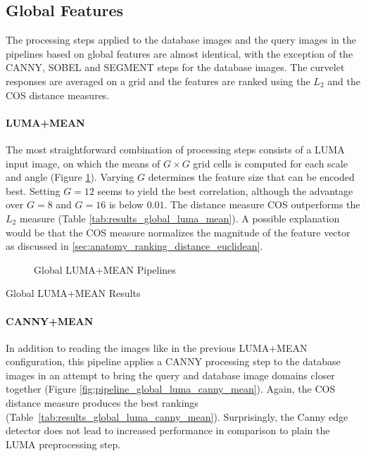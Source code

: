 \subsection{Global Features}

The processing steps applied to the database images and the query images in the
pipelines based on global features are almost identical, with the exception of
the CANNY, SOBEL and SEGMENT steps for the database images. The curvelet
responses are averaged on a grid and the features are ranked using the $L_2$
and the COS distance measures.

\paragraph{LUMA+MEAN}

The most straightforward combination of processing steps consists of a LUMA
input image, on which the means of $G \times G$ grid cells is computed for each
scale and angle (Figure \ref{fig:pipeline_global_luma_mean}).  Varying $G$
determines the feature size that can be encoded best. Setting $G=12$ seems to
yield the best correlation, although the advantage over $G=8$ and $G=16$ is
below $0.01$. The distance measure COS outperforms the $L_2$ measure (Table
\ref{tab:results_global_luma_mean}). A possible explanation would be that the
COS measure normalizes the magnitude of the feature vector as discussed in
\ref{sec:anatomy_ranking_distance_euclidean}.

\begin{figure}[h]
    \centering
    
    \caption[Global LUMA+MEAN Pipelines]{
        Global LUMA+MEAN Pipelines
    }
    \label{fig:pipeline_global_luma_mean}
\end{figure}

\begin{table}[h]
    \centering
    
    \caption[Global LUMA+MEAN Results]{
        Global LUMA+MEAN Results
    }
    \label{tab:results_global_luma_mean}
\end{table}

\paragraph{CANNY+MEAN}

In addition to reading the images like in the previous LUMA+MEAN configuration,
this pipeline applies a CANNY processing step to the database images in an
attempt to bring the query and database image domains closer together (Figure
\ref{fig:pipeline_global_luma_canny_mean}). Again, the COS distance measure
produces the best rankings (Table~\ref{tab:results_global_luma_canny_mean}).
Surprisingly, the Canny edge detector does not lead to increased performance in
comparison to plain the LUMA preprocessing step.

